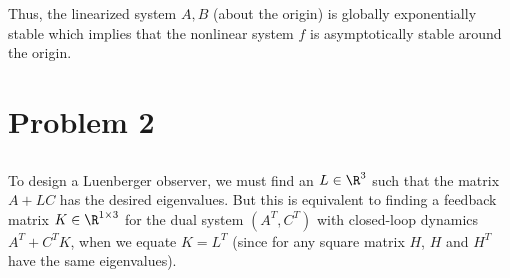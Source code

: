 \documentclass{homework}
\begin{document}
Thus, the linearized system $A, B$ (about the origin) is globally exponentially stable which implies that the nonlinear system $f$
is asymptotically stable around the origin.

\section{Problem 2}
\subsection{}
To design a Luenberger observer, we must find an $L\in\R^3$ such that the matrix $A + LC$ has the desired eigenvalues.
But this is equivalent to finding a feedback matrix $K\in\R^{1\times 3}$
for the dual system $(A^T, C^T)$ with closed-loop dynamics $A^T + C^T K$, when
we equate $K=L^T$ (since for any square matrix $H$, $H$ and $H^T$ have the same eigenvalues).
\end{document}
